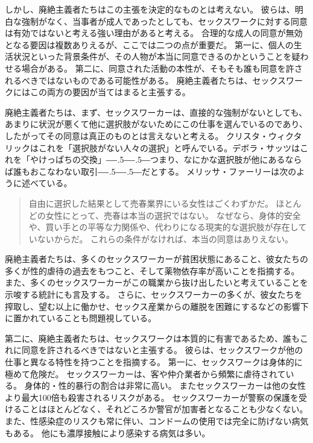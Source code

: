 \documentclass[paper=a4,book,openany]{jlreq}
\def\DDASH{―\kern-.5\zw―\kern-.5\zw―} %
\begin{document}
しかし、廃絶主義者たちはこの主張を決定的なものとは考えない。
彼らは、明白な強制がなく、当事者が成人であったとしても、セックスワークに対する同意は有効ではないと考える強い理由があると考える。
合理的な成人の同意が無効となる要因は複数ありえるが、ここでは二つの点が重要だ。
第一に、個人の生活状況といった背景条件が、その人物が本当に同意できるのかということを疑わせる場合がある。
第二に、同意された活動の本性が、そもそも誰も同意を許されるべきではないものである可能性がある。
廃絶主義者たちは、セックスワークにはこの両方の要因が当てはまると主張する。

廃絶主義者たちは、まず、セックスワーカーは、直接的な強制がないとしても、あまりに状況が悪くて他に選択肢がないためにこの仕事を選んでいるのであり、したがってその同意は真正のものとは言えないと考える。
クリスタ・ウィクタリックはこれを「選択肢がない人々の選択」と呼んでいる\citep[p.63]{wichterich00:_global_woman}。デボラ・サッツはこれを「やけっぱちの交換」{\DDASH}つまり、なにかな選択肢が他にあるならば誰もおこなわない取引{\DDASH}だとする\citep[p.71]{satz95:_market_women_sexual_labor}。
メリッサ・ファーリーは次のように述べている。

\begin{quote}
自由に選択した結果として売春業界にいる女性はごくわずかだ。
ほとんどの女性にとって、売春は本当の選択ではない。
なぜなら、身体的安全や、買い手との平等な力関係や、代わりになる現実的な選択肢が存在していないからだ。
これらの条件がなければ、本当の同意はありえない。
\citep{farley13:_prost_liber_slaver}
\end{quote}

廃絶主義者たちは、多くのセックスワーカーが貧困状態にあること、彼女たちの多くが性的虐待の過去をもつこと、そして薬物依存率が高いことを指摘する。
また、多くのセックスワーカーがこの職業から抜け出したいと考えていることを示唆する統計にも言及する。
さらに、セックスワーカーの多くが、彼女たちを搾取し、望む以上に働かせ、セックス産業からの離脱を困難にするなどの影響下に置かれていることも問題視している。

第二に、廃絶主義者たちは、セックスワークは本質的に有害であるため、誰もこれに同意を許されるべきではないと主張する。
彼らは、セックスワークが他の仕事と異なる特性を持つことを指摘する。
第一に、セックスワークは身体的に極めて危険だ。
セックスワーカーは、客や仲介業者から頻繁に虐待されている。
身体的・性的暴行の割合は非常に高い。
またセックスワーカーは他の女性より最大100倍も殺害されるリスクがある\citep{salfati08:_prost_homic}。
セックスワーカーが警察の保護を受けることはほとんどなく、それどころか警官が加害者となることも少なくない。
また、性感染症のリスクも常に伴い、コンドームの使用では完全に防げない病気もある。
他にも濃厚接触により感染する病気は多い。
\end{document}
